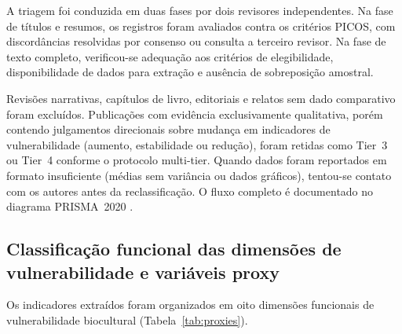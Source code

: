 \documentclass[12pt,a4paper]{article}
\begin{document}
A triagem foi conduzida em duas fases por dois revisores independentes. Na fase de títulos e resumos, os registros foram avaliados contra os critérios PICOS, com discordâncias resolvidas por consenso ou consulta a terceiro revisor. Na fase de texto completo, verificou-se adequação aos critérios de elegibilidade, disponibilidade de dados para extração e ausência de sobreposição amostral.

Revisões narrativas, capítulos de livro, editoriais e relatos sem dado comparativo foram excluídos. Publicações com evidência exclusivamente qualitativa, porém contendo julgamentos direcionais sobre mudança em indicadores de vulnerabilidade (aumento, estabilidade ou redução), foram retidas como Tier~3 ou Tier~4 conforme o protocolo multi-tier. Quando dados foram reportados em formato insuficiente (médias sem variância ou dados gráficos), tentou-se contato com os autores antes da reclassificação. O fluxo completo é documentado no diagrama PRISMA~2020 \citep{Page2021}.

\subsection{Classificação funcional das dimensões de vulnerabilidade e variáveis proxy}
\label{sec:dimensions}

Os indicadores extraídos foram organizados em oito dimensões funcionais de vulnerabilidade biocultural (Tabela~\ref{tab:proxies}).
\end{document}
